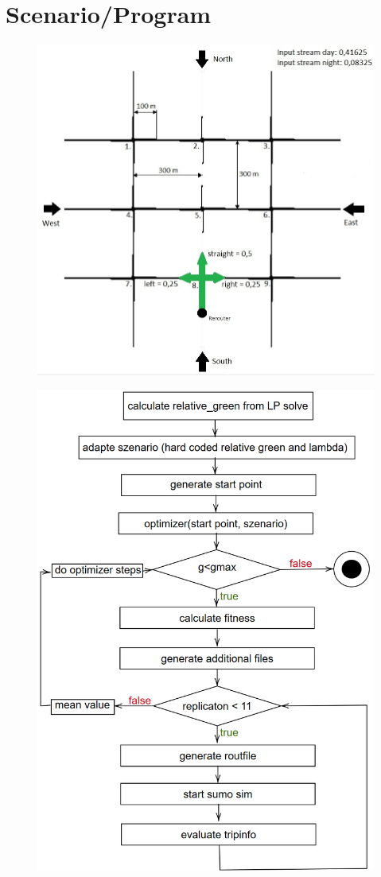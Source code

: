 \documentclass{beamer}
\begin{document}
	\section{Scenario/Program}
	\frame{\tableofcontents[currentsection]}
	
	\begin{frame}
		
		
		\begin{figure}[H]
			\centering
			\includegraphics[width=0.7\linewidth]{3x3_inf}
			\label{fig:3x3inf}
		\end{figure}
	\end{frame}
	
	\begin{frame}
		\begin{figure}[H]
			\centering
			\includegraphics[width=0.45\linewidth]{diagram-202001222}
			\label{fig:diagram-202001222}
		\end{figure}
	\end{frame}
\end{document}
